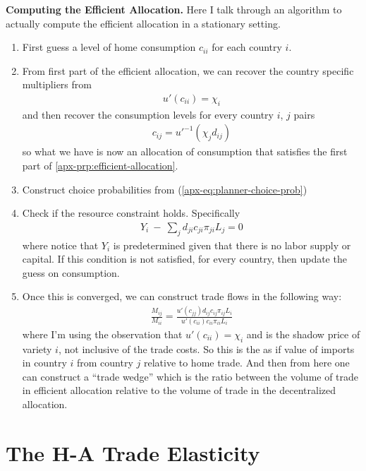\documentclass[12pt,pdftex]{article}
\begin{document}
\begin{onehalfspacing}
\textbf{Computing the Efficient Allocation.} Here I talk through an algorithm to actually compute the efficient allocation in a stationary setting.
\begin{enumerate}
\item First guess a level of home consumption $c_{ii}$ for each country $i$.

\item From first part of the efficient allocation, we can recover the country specific multipliers from
\begin{align}
u'(c_{ii}) = \chi_{i}
\end{align}
and then recover the consumption levels for every country $i$, $j$ pairs
\begin{align}
c_{ij} = u'^{-1}(\chi_{j} d_{ij})
\end{align}
so what we have is now an allocation of consumption that satisfies the first part of \ref{apx-prp:efficient-allocation}.

\item Construct choice probabilities from (\ref{apx-eq:planner-choice-prob})

\item Check if the resource constraint holds. Specifically
\begin{align}
 Y_{i} \  - \ \sum_{j} d_{ji} c_{ji} \pi_{ji} L_{j} = 0
\end{align}
where notice that $Y_{i}$ is predetermined given that there is no labor supply or capital. If this condition is not satisfied, for every country, then update the guess on consumption.

\item Once this is converged, we can construct trade flows in the following way:
\begin{align}
\frac{M_{ij}}{M_{ii}} = \frac{u'(c_{jj}) d_{ij} c_{ij} \pi_{ij} L_i}{u'(c_{ii})c_{ii}\pi_{ii}L_i}
\end{align}
where I'm using the observation that $u'(c_{ii}) = \chi_{i}$ and is the shadow price of variety $i$, not inclusive of the trade costs. So this is the as if value of imports in country $i$ from country $j$ relative to home trade. And then from here one can construct a ``trade wedge'' which is the ratio between the volume of trade in efficient allocation relative to the volume of trade in the decentralized allocation.
\end{enumerate}


\newpage


\section{The H-A Trade Elasticity}


\end{onehalfspacing}
\end{document}
